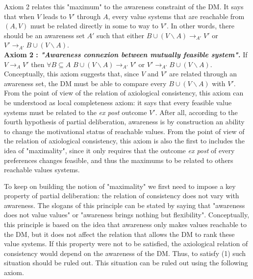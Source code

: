 \documentclass[11pt]{article}
\begin{document}
Axiom 2 relates this "maximum" to the awareness constraint of the DM. It says that when $V$ leads to $V'$ through $A$, every value systems that are reachable from $(A,V)$ must be related directly in some to way to $V'$. In other words, there should be an awareness set $A'$ such that either $B\cup (V\backslash A)\rightarrow_{A'} V'$ or $V'\rightarrow_{A'} B\cup (V\backslash A)$.
\\

\noindent
\textbf{Axiom 2 : \textit{"Awareness connexion between mutually feasible system".}} If $V\rightarrow_{A} V'$ then $\forall B\subseteq A$ $B\cup (V\backslash A)\rightarrow_{A'} V'$ or $V'\rightarrow_{A'} B\cup (V\backslash A)$. 
\\

  Conceptually, this axiom suggests that, since $V$ and $V'$ are related through an awareness set, the DM must be able to compare every $B\cup (V\backslash A)$ with $V'$. From the point of view of the relation of axiological consistency, this axiom can be understood as local completeness axiom: it says that every feasible value systems must be related to the \textit{ex post} outcome $V'$. After all, according to the fourth hypothesis of partial deliberation, awareness is by construction an ability to change the motivational status of reachable values. From the point of view of the relation of axiological consistency, this axiom is also the first to includes the idea of "maximality", since it only requires that the outcome \textit{ex post} of every preferences changes feasible, and thus the maximums to be related to others reachable values systems.  

To keep on building the notion of "maximality" we first need to impose a key property of partial deliberation: the relation of consistency does not vary with awareness. The slogans of this principle can be stated by saying that "awareness does not value values" or "awareness brings nothing but flexibility". Conceptually, this principle is based on the idea that awareness only makes values reachable to the DM, but it does not affect the relation that allows the DM to rank these value systems. If this property were not to be satisfied, the axiological relation of consistency would depend on the awareness of the DM. Thus, to satisfy (1) such situation should be ruled out. This situation can be ruled out using the following axiom.
\end{document}

